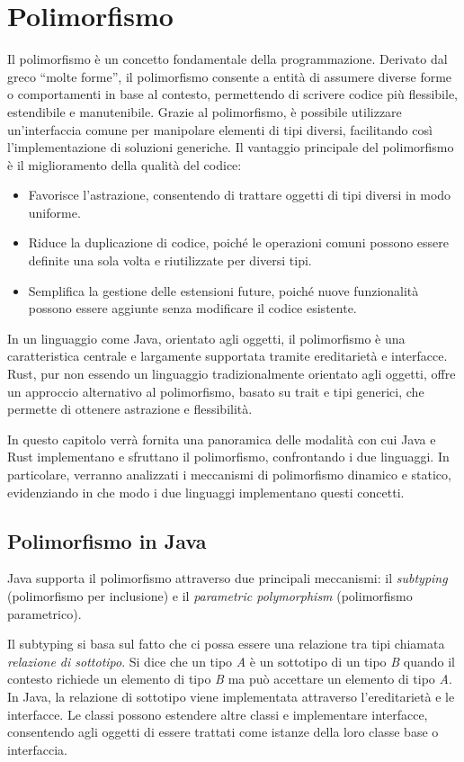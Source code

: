 
\chapter{Polimorfismo}
Il polimorfismo è un concetto fondamentale della programmazione. Derivato dal greco “molte forme”, il polimorfismo consente a entità di assumere diverse forme o comportamenti in base al contesto, permettendo di scrivere codice più flessibile, estendibile e manutenibile. Grazie al polimorfismo, è possibile utilizzare un'interfaccia comune per manipolare elementi di tipi diversi, facilitando così l'implementazione di soluzioni generiche. Il vantaggio principale del polimorfismo è il miglioramento della qualità del codice:
\begin{itemize}
    \item Favorisce l'astrazione, consentendo di trattare oggetti di tipi diversi in modo uniforme.
    \item Riduce la duplicazione di codice, poiché le operazioni comuni possono essere definite una sola volta e riutilizzate per diversi tipi.
    \item Semplifica la gestione delle estensioni future, poiché nuove funzionalità possono essere aggiunte senza modificare il codice esistente.
\end{itemize}
In un linguaggio come Java, orientato agli oggetti, il polimorfismo è una caratteristica centrale e largamente supportata tramite ereditarietà e interfacce. Rust, pur non essendo un linguaggio tradizionalmente orientato agli oggetti, offre un approccio alternativo al polimorfismo, basato su trait e tipi generici, che permette di ottenere astrazione e flessibilità.

In questo capitolo verrà fornita una panoramica delle modalità con cui Java e Rust implementano e sfruttano il polimorfismo, confrontando i due linguaggi. In particolare, verranno analizzati i meccanismi di polimorfismo dinamico e statico, evidenziando in che modo i due linguaggi implementano questi concetti.

\section{Polimorfismo in Java}
Java supporta il polimorfismo attraverso due principali meccanismi: il \textit{subtyping} (polimorfismo per inclusione) e il \textit{parametric polymorphism} (polimorfismo parametrico). 

Il subtyping si basa sul fatto che ci possa essere una relazione tra tipi chiamata \textit{relazione di sottotipo}. Si dice che un tipo \textit{A} è un sottotipo di un tipo \textit{B} quando il contesto richiede un elemento di tipo \textit{B} ma può accettare un elemento di tipo \textit{A}. In Java, la relazione di sottotipo viene implementata attraverso l'ereditarietà e le interfacce. Le classi possono estendere altre classi e implementare interfacce, consentendo agli oggetti di essere trattati come istanze della loro classe base o interfaccia. 

